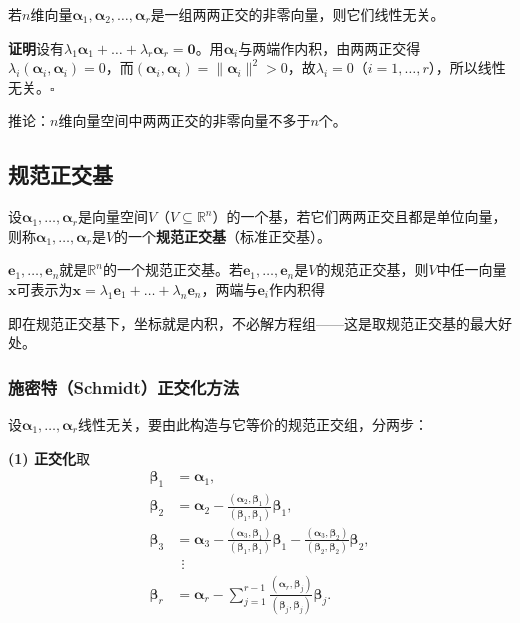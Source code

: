\begin{theorem}
若$n$维向量$\boldsymbol{\alpha}_1,\boldsymbol{\alpha}_2,\dots,\boldsymbol{\alpha}_r$是一组两两正交的非零向量，则它们线性无关。
\end{theorem}

\textbf{证明}\quad 设有$\lambda_1\boldsymbol{\alpha}_1+\dots+\lambda_r\boldsymbol{\alpha}_r=\boldsymbol{0}$。用$\boldsymbol{\alpha}_i$与两端作内积，由两两正交得$\lambda_i(\boldsymbol{\alpha}_i,\boldsymbol{\alpha}_i)=0$，而$(\boldsymbol{\alpha}_i,\boldsymbol{\alpha}_i)=\|\boldsymbol{\alpha}_i\|^{2}>0$，故$\lambda_i=0$（$i=1,\dots,r$），所以线性无关。\hfill$\square$

推论：$n$维向量空间中两两正交的非零向量不多于$n$个。

\subsection{规范正交基}
\begin{definition}[规范正交基]
设$\boldsymbol{\alpha}_1,\dots,\boldsymbol{\alpha}_r$是向量空间$V$（$V\subseteq\mathbb{R}^{n}$）的一个基，若它们两两正交且都是单位向量，则称$\boldsymbol{\alpha}_1,\dots,\boldsymbol{\alpha}_r$是$V$的一个\textbf{规范正交基}（标准正交基）。
\end{definition}

$\boldsymbol{e}_1,\dots,\boldsymbol{e}_n$就是$\mathbb{R}^{n}$的一个规范正交基。若$\boldsymbol{e}_1,\dots,\boldsymbol{e}_n$是$V$的规范正交基，则$V$中任一向量$\boldsymbol{x}$可表示为$\boldsymbol{x}=\lambda_1\boldsymbol{e}_1+\dots+\lambda_n\boldsymbol{e}_n$，两端与$\boldsymbol{e}_i$作内积得


即在规范正交基下，坐标就是内积，不必解方程组——这是取规范正交基的最大好处。

\subsubsection{施密特（Schmidt）正交化方法}
设$\boldsymbol{\alpha}_1,\dots,\boldsymbol{\alpha}_r$线性无关，要由此构造与它等价的规范正交组，分两步：

\textbf{(1) 正交化}\quad 取
\[
\begin{aligned}
\boldsymbol{\beta}_1&=\boldsymbol{\alpha}_1,\\
\boldsymbol{\beta}_2&=\boldsymbol{\alpha}_2-\frac{(\boldsymbol{\alpha}_2,\boldsymbol{\beta}_1)}{(\boldsymbol{\beta}_1,\boldsymbol{\beta}_1)}\boldsymbol{\beta}_1,\\
\boldsymbol{\beta}_3&=\boldsymbol{\alpha}_3-\frac{(\boldsymbol{\alpha}_3,\boldsymbol{\beta}_1)}{(\boldsymbol{\beta}_1,\boldsymbol{\beta}_1)}\boldsymbol{\beta}_1
-\frac{(\boldsymbol{\alpha}_3,\boldsymbol{\beta}_2)}{(\boldsymbol{\beta}_2,\boldsymbol{\beta}_2)}\boldsymbol{\beta}_2,\\
&\ \ \vdots\\
\boldsymbol{\beta}_r&=\boldsymbol{\alpha}_r-\sum_{j=1}^{r-1}\frac{(\boldsymbol{\alpha}_r,\boldsymbol{\beta}_j)}{(\boldsymbol{\beta}_j,\boldsymbol{\beta}_j)}\boldsymbol{\beta}_j .
\end{aligned}
\]

